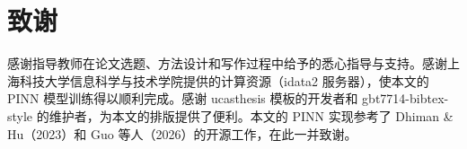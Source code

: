 %
%
%
%
%
%
%
%
%
%
%
%

\chapter[致谢]{致\quad 谢}%
\pagestyle{mainmatterstyle} %

感谢指导教师在论文选题、方法设计和写作过程中给予的悉心指导与支持。感谢上海科技大学信息科学与技术学院提供的计算资源（idata2 服务器），使本文的 PINN 模型训练得以顺利完成。感谢 ucasthesis 模板的开发者和 gbt7714-bibtex-style 的维护者，为本文的排版提供了便利。本文的 PINN 实现参考了 Dhiman \& Hu（2023）和 Guo 等人（2026）的开源工作，在此一并致谢。

\cleardoublepage[plain]%

